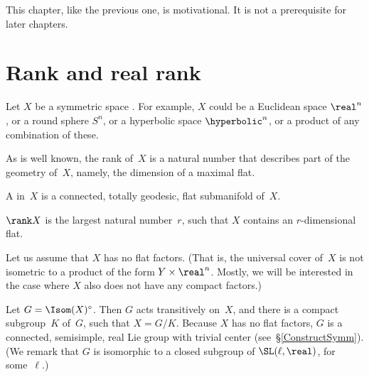 
\label{GeomIntroRank}


This chapter, like the previous one, is motivational. It is not a
prerequisite for later chapters.



\section{Rank and real rank} \label{IntroRrankSect}

Let $X$ be a symmetric space . 
For example, $X$ could
be a Euclidean space $\real^n$, or a round sphere $S^n$, or a hyperbolic
space $\hyperbolic^n$, or a product of any combination of these.


As is well known, the rank of~$X$ is a natural number that
describes part of the geometry of~$X$, namely, the
dimension of a maximal flat.

\begin{defn}
 A  in~$X$ is a connected, totally geodesic,
flat submanifold of~$X$.
 \end{defn}

\begin{defn}
 $\rank X$ is the largest natural number~$r$, such that
$X$ contains an $r$-dimensional flat.
 \end{defn}

Let us assume that $X$ has no flat factors. (That is, the universal
cover of~$X$ is not isometric to a product of the form $Y \times
\real^n$. Mostly, we will be interested in the case where
$X$ also does not have any compact factors.)

Let $G = \Isom(X)^\circ$. Then $G$ acts transitively on~$X$, and there
is a compact subgroup~$K$ of~$G$, such that $X = G/K$. Because $X$ has no
flat factors, $G$ is a connected, semisimple, real Lie group with
trivial center (see~\S\ref{ConstructSymm}). (We remark that $G$ is
isomorphic to a closed subgroup of $\SL(\ell,\real)$, for some~$\ell$.)

